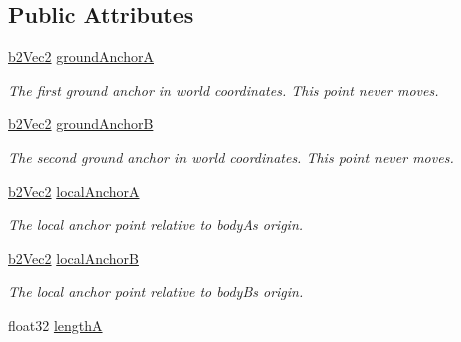 \subsection*{Public Attributes}
\begin{DoxyCompactItemize}
\item 
\hyperlink{structb2_vec2}{b2\+Vec2} \hyperlink{structb2_pulley_joint_def_aae77c020ce4629ab9e03560e28aa853d}{ground\+AnchorA}\hypertarget{structb2_pulley_joint_def_aae77c020ce4629ab9e03560e28aa853d}{}\label{structb2_pulley_joint_def_aae77c020ce4629ab9e03560e28aa853d}

\begin{DoxyCompactList}\small\item\em The first ground anchor in world coordinates. This point never moves. \end{DoxyCompactList}\item 
\hyperlink{structb2_vec2}{b2\+Vec2} \hyperlink{structb2_pulley_joint_def_aa412b9f3bffd1fb69ace14f9b3e03b82}{ground\+AnchorB}\hypertarget{structb2_pulley_joint_def_aa412b9f3bffd1fb69ace14f9b3e03b82}{}\label{structb2_pulley_joint_def_aa412b9f3bffd1fb69ace14f9b3e03b82}

\begin{DoxyCompactList}\small\item\em The second ground anchor in world coordinates. This point never moves. \end{DoxyCompactList}\item 
\hyperlink{structb2_vec2}{b2\+Vec2} \hyperlink{structb2_pulley_joint_def_ad7677a4ad02a6e7cb8699fc5012eac3e}{local\+AnchorA}\hypertarget{structb2_pulley_joint_def_ad7677a4ad02a6e7cb8699fc5012eac3e}{}\label{structb2_pulley_joint_def_ad7677a4ad02a6e7cb8699fc5012eac3e}

\begin{DoxyCompactList}\small\item\em The local anchor point relative to bodyA\textquotesingle{}s origin. \end{DoxyCompactList}\item 
\hyperlink{structb2_vec2}{b2\+Vec2} \hyperlink{structb2_pulley_joint_def_aed3f9c9f5f4145ceb32e7e164de73144}{local\+AnchorB}\hypertarget{structb2_pulley_joint_def_aed3f9c9f5f4145ceb32e7e164de73144}{}\label{structb2_pulley_joint_def_aed3f9c9f5f4145ceb32e7e164de73144}

\begin{DoxyCompactList}\small\item\em The local anchor point relative to bodyB\textquotesingle{}s origin. \end{DoxyCompactList}\item 
float32 \hyperlink{structb2_pulley_joint_def_a51d945882c1d7a78af2b0e9ffb31a33b}{lengthA}\hypertarget{structb2_pulley_joint_def_a51d945882c1d7a78af2b0e9ffb31a33b}{}\label{structb2_pulley_joint_def_a51d945882c1d7a78af2b0e9ffb31a33b}


\end{DoxyCompactItemize}
